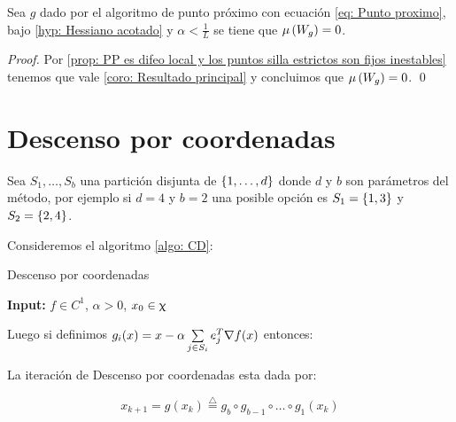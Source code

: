 \begin{corollary}
	\label{coro: PP converge a minimos}
	Sea $g$ dado por el algoritmo de punto pr\'oximo con ecuaci\'on \ref{eq: Punto proximo}, bajo \ref{hyp: Hessiano acotado} y $\alpha < \frac{1}{L}$ se tiene que $\mu\left(W_g\right) = 0$.
\end{corollary}

\begin{proof}
	Por \ref{prop: PP es difeo local y los puntos silla estrictos son fijos inestables} tenemos que vale \ref{coro: Resultado principal} y concluimos que $\mu \left(W_g\right) = 0$. \qed
\end{proof}

\section{Descenso por coordenadas}

Sea $S_1, \dots, S_b$ una partici\'on disjunta de $\left\lbrace1, \dots, d\right\rbrace$ donde $d$ y $b$ son par\'ametros del m\'etodo, por ejemplo si $d =4$ y $b=2$ una posible opci\'on es $S_1 = \left\lbrace1,3\right\rbrace$ y $S_2 = \left\lbrace2,4\right\rbrace$.

Consideremos el algoritmo \ref{algo: CD}:

\LinesNumbered
\begin{algorithm}[H]
	\caption{Descenso por coordenadas\label{algo: CD}}
	\textbf{Input:} $f \in C^1$, $\alpha >0$, $x_0 \in \upchi$ \\
\end{algorithm}

Luego si definimos $g_i(x) = x - \alpha \sum\limits_{j \in S_i}{e_j^T \nabla f(x)}$ entonces:

\begin{lemma}
	La iteraci\'on de Descenso por coordenadas esta dada por:
	
	\begin{equation}
		\label{eq: DC}
		x_{k+1} = g(x_k) \stackrel{\triangle}{=} g_b \circ g_{b-1} \circ \dots \circ g_1(x_k)
	\end{equation}
	
\end{lemma}

